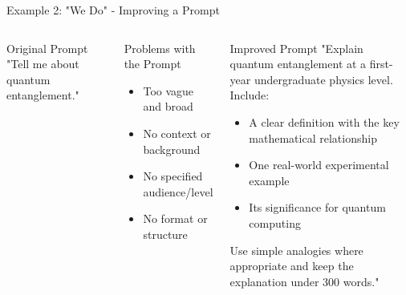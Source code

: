 \documentclass{beamer}
\begin{document}
\begin{frame}{Example 2: "We Do" - Improving a Prompt}
\begin{columns}
\begin{block}{Original Prompt}
"Tell me about quantum entanglement."
\end{block}
\pause
\begin{alertblock}{Problems with the Prompt}
\begin{itemize}
  \item Too vague and broad
  \item No context or background
  \item No specified audience/level
  \item No format or structure
\end{itemize}
\end{alertblock}
\pause
{}
\begin{block}{Improved Prompt}
"Explain quantum entanglement at a first-year undergraduate physics level. Include:
\begin{itemize}
  \item A clear definition with the key mathematical relationship
  \item One real-world experimental example
  \item Its significance for quantum computing
\end{itemize}
Use simple analogies where appropriate and keep the explanation under 300 words."
\end{block}
\end{columns}
\end{frame}
\end{document}
